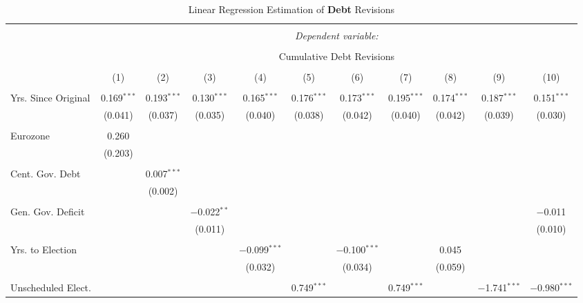 
\begin{table}[!htbp] \centering 
  \caption{Linear Regression Estimation of \textbf{Debt} Revisions} 
  \label{debt_results} 
\tiny 
\begin{tabular}{@{\extracolsep{5pt}}lcccccccccc} 
\\[-1.8ex]\hline 
\hline \\[-1.8ex] 
 & \multicolumn{10}{c}{\textit{Dependent variable:}} \\ 
\cline{2-11} 
\\[-1.8ex] & \multicolumn{10}{c}{Cumulative Debt Revisions} \\ 
\\[-1.8ex] & (1) & (2) & (3) & (4) & (5) & (6) & (7) & (8) & (9) & (10)\\ 
\hline \\[-1.8ex] 
 Yrs. Since Original & 0.169$^{***}$ & 0.193$^{***}$ & 0.130$^{***}$ & 0.165$^{***}$ & 0.176$^{***}$ & 0.173$^{***}$ & 0.195$^{***}$ & 0.174$^{***}$ & 0.187$^{***}$ & 0.151$^{***}$ \\ 
  & (0.041) & (0.037) & (0.035) & (0.040) & (0.038) & (0.042) & (0.040) & (0.042) & (0.039) & (0.030) \\ 
  & & & & & & & & & & \\ 
 Eurozone & 0.260 &  &  &  &  &  &  &  &  &  \\ 
  & (0.203) &  &  &  &  &  &  &  &  &  \\ 
  & & & & & & & & & & \\ 
 Cent. Gov. Debt &  & 0.007$^{***}$ &  &  &  &  &  &  &  &  \\ 
  &  & (0.002) &  &  &  &  &  &  &  &  \\ 
  & & & & & & & & & & \\ 
 Gen. Gov. Deficit &  &  & $-$0.022$^{**}$ &  &  &  &  &  &  & $-$0.011 \\ 
  &  &  & (0.011) &  &  &  &  &  &  & (0.010) \\ 
  & & & & & & & & & & \\ 
 Yrs. to Election &  &  &  & $-$0.099$^{***}$ &  & $-$0.100$^{***}$ &  & 0.045 &  &  \\ 
  &  &  &  & (0.032) &  & (0.034) &  & (0.059) &  &  \\ 
  & & & & & & & & & & \\ 
 Unscheduled Elect. &  &  &  &  & 0.749$^{***}$ &  & 0.749$^{***}$ &  & $-$1.741$^{***}$ & $-$0.980$^{***}$ \\ 

\end{tabular}
\end{table}
